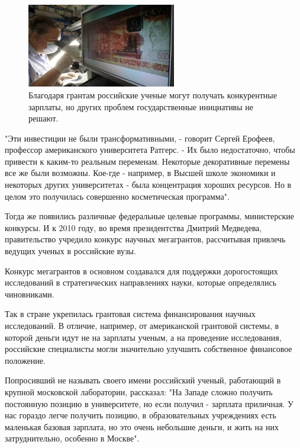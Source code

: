 \begin{figure}
    \begin{center}
        \includegraphics[width=0.58\textwidth]{img/bigmoney.png}
    \end{center}
    \caption{Благодаря грантам российские ученые могут получать конкурентные зарплаты, но других проблем государственные инициативы не решают.}
\end{figure}
"Эти инвестиции не были трансформативными, - говорит Сергей Ерофеев, профессор американского университета Ратгерс. - Их было недостаточно, чтобы привести к каким-то реальным переменам. Некоторые декоративные перемены все же были возможны. Кое-где - например, в Высшей школе экономики и некоторых других университетах - была концентрация хороших ресурсов. Но в целом это получилась совершенно косметическая программа".

Тогда же появились различные федеральные целевые программы, министерские конкурсы. И к 2010 году, во время президентства Дмитрий Медведева, правительство учредило конкурс научных мегагрантов, рассчитывая привлечь ведущих ученых в российские вузы.

Конкурс мегагрантов в основном создавался для поддержки дорогостоящих исследований в стратегических направлениях науки, которые определялись чиновниками.

Так в стране укрепилась грантовая система финансирования научных исследований. В отличие, например, от американской грантовой системы, в которой деньги идут не на зарплаты ученым, а на проведение исследования, российские специалисты могли значительно улучшить собственное финансовое положение.

Попросивший не называть своего имени российский ученый, работающий в крупной московской лаборатории, рассказал: "На Западе сложно получить постоянную позицию в университете, но если получил - зарплата приличная. У нас гораздо легче получить позицию, в образовательных учреждениях есть маленькая базовая зарплата, но это очень небольшие деньги, и жить на них затруднительно, особенно в Москве".

